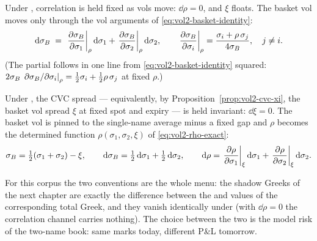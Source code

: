 \begin{definition}[\stickyrho]
\label{def:vol2-stickyrho}
Under \stickyrho, correlation is held fixed as vols move: $\dd\rho = 0$,
and $\xi$ floats. The basket vol moves only through the vol arguments of
\eqref{eq:vol2-basket-identity}:
\begin{equation}
\mathrm{d}\sigma_B \;=\; \left.\frac{\partial \sigma_B}{\partial \sigma_1}\right|_{\rho}\mathrm{d}\sigma_1
        + \left.\frac{\partial \sigma_B}{\partial \sigma_2}\right|_{\rho}\mathrm{d}\sigma_2,
\qquad
\left.\frac{\partial \sigma_B}{\partial \sigma_i}\right|_{\rho}
 = \frac{\sigma_i + \rho\,\sigma_j}{4\sigma_B},\quad j \ne i.
\label{eq:vol2-stickyrho-dsB}
\end{equation}
(The partial follows in one line from \eqref{eq:vol2-basket-identity}
squared: $2\sigma_B\,\left.\partial\sigma_B/\partial\sigma_i\right|_{\rho} =
\tfrac12\sigma_i + \tfrac12\rho\,\sigma_j$ at fixed $\rho$.)
\end{definition}

\begin{definition}[\stickycvc]
\label{def:vol2-stickycvc}
Under \stickycvc, the CVC spread --- equivalently, by
Proposition~\ref{prop:vol2-cvc-xi}, the basket vol spread $\xi$ at fixed
spot and expiry --- is held invariant: $\dd\xi = 0$. The basket vol is
pinned to the single-name average minus a fixed gap and $\rho$ becomes the
determined function $\rho(\sigma_1, \sigma_2, \xi)$ of
\eqref{eq:vol2-rho-exact}:
\begin{equation}
\sigma_B = \tfrac12(\sigma_1 + \sigma_2) - \xi,
\qquad
\mathrm{d}\sigma_B = \tfrac12\,\mathrm{d}\sigma_1 + \tfrac12\,\mathrm{d}\sigma_2,
\qquad
\mathrm{d}\rho = \left.\frac{\partial \rho}{\partial \sigma_1}\right|_{\xi}\mathrm{d}\sigma_1
        + \left.\frac{\partial \rho}{\partial \sigma_2}\right|_{\xi}\mathrm{d}\sigma_2 .
\label{eq:vol2-stickycvc-dsB}
\end{equation}
\end{definition}

\begin{remark}
\label{rem:vol2-sticky-pair}
For this corpus the two conventions are the whole menu: the shadow Greeks
of the next chapter are exactly the difference between the \stickycvc{} and
\stickyrho{} values of the corresponding total Greek, and they vanish
identically under \stickyrho{} (with $\dd\rho = 0$ the correlation channel
carries nothing). The choice between the two is the model risk of the
two-name book: same marks today, different P\&L tomorrow.
\end{remark}

